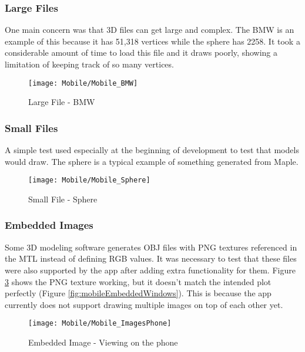         \subsubsection{Large Files}
        
            One main concern was that 3D files can get large and complex. The BMW is an example of this because it has 51,318 vertices while the sphere has 2258. It took a considerable amount of time to load this file and it draws poorly, showing a limitation of keeping track of so many vertices.
            \begin{figure}[H]
                \texttt{[image: Mobile/Mobile\_BMW]}
                \centering
                \caption{Large File - BMW}
                \label{fig:mobileBMW}
            \end{figure}
    
        \subsubsection{Small Files}
            A simple test used especially at the beginning of development to test that models would draw. The sphere is a typical example of something generated from Maple. 
        
            \begin{figure}[H]
                \texttt{[image: Mobile/Mobile\_Sphere]}
                \centering
                \caption{Small File - Sphere}
                \label{fig:mobileSphere}
            \end{figure}
            
        \subsubsection{Embedded Images}
            
            Some 3D modeling software generates OBJ files with PNG textures referenced in the MTL instead of defining RGB values. It was necessary to test that these files were also supported by the app after adding extra functionality for them. Figure \ref{fig:mobileEmbeddedPhone} shows the PNG texture working, but it doesn't match the intended plot perfectly (Figure \ref{fig:mobileEmbeddedWindows}). This is because the app currently does not support drawing multiple images on top of each other yet.
        
            \begin{figure}[H]
                \texttt{[image: Mobile/Mobile\_ImagesPhone]}
                \centering
                \caption{Embedded Image - Viewing on the phone}
                \label{fig:mobileEmbeddedPhone}
            \end{figure}

